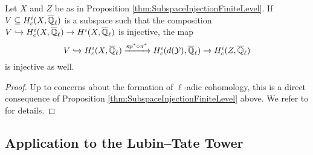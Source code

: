 \documentclass[../main.tex]{subfiles}
\begin{document}
\begin{thm}\label{thm:MiedaInjectivityAtFiniteLevel}
  Let $X$ and $Z$ be as in Proposition \ref{thm:SubspaceInjectionFiniteLevel}.
  If $V \subseteq H^i_c(X, {\overline {\mathbb{Q}}_\ell})$ is a subspace such that the 
  composition $V \hookrightarrow H^i_c(X, {\overline {\mathbb{Q}}_\ell}) \to H^i(X, {\overline {\mathbb{Q}}_\ell})$ is injective,
  the map 
  \begin{equation*}
    V \hookrightarrow H^i_c(X, {\overline {\mathbb{Q}}_\ell}) \xrightarrow{\mathrm{sp}^* \circ \pi^*}
    H^i_c(d(\mathcal{Y}), {\overline {\mathbb{Q}}_\ell}) \to H^i_c(Z, {\overline {\mathbb{Q}}_\ell})
  \end{equation*}
  is injective as well.
\begin{proof}
  Up to concerns about the formation of $\ell$-adic cohomology, this is a
  direct consequence of Proposition \ref{thm:SubspaceInjectionFiniteLevel}
  above. We refer to \cite[Theorem 2.8]{mieda2016geometric} for details.
\end{proof}
\end{thm}





\subsection{Application to the Lubin--Tate Tower} %
\label{sub:Application to the Lubin--Tate Tower}
\end{document}
